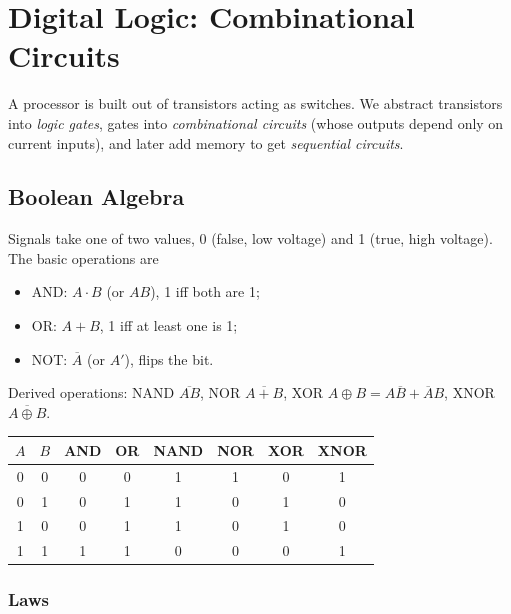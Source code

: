 \chapter{Digital Logic: Combinational Circuits}

A processor is built out of transistors acting as switches. We abstract
transistors into \emph{logic gates}, gates into \emph{combinational
circuits} (whose outputs depend only on current inputs), and later add
memory to get \emph{sequential circuits}.

\section{Boolean Algebra}

Signals take one of two values, 0 (false, low voltage) and 1 (true, high
voltage). The basic operations are
\begin{itemize}
  \item AND: $A \cdot B$ (or $AB$), 1 iff both are 1;
  \item OR: $A + B$, 1 iff at least one is 1;
  \item NOT: $\overline{A}$ (or $A'$), flips the bit.
\end{itemize}
Derived operations: NAND $\overline{AB}$, NOR $\overline{A+B}$,
XOR $A \oplus B = A\overline{B} + \overline{A}B$, XNOR $\overline{A\oplus B}$.

\begin{center}
\begin{tabular}{cc|cccccc}
\toprule
$A$ & $B$ & AND & OR & NAND & NOR & XOR & XNOR \\
\midrule
0 & 0 & 0 & 0 & 1 & 1 & 0 & 1 \\
0 & 1 & 0 & 1 & 1 & 0 & 1 & 0 \\
1 & 0 & 0 & 1 & 1 & 0 & 1 & 0 \\
1 & 1 & 1 & 1 & 0 & 0 & 0 & 1 \\
\bottomrule
\end{tabular}
\end{center}

\subsection{Laws}

